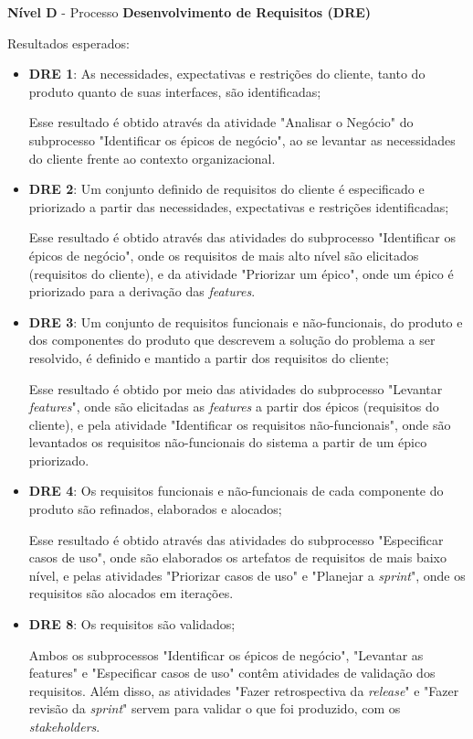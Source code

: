       \noindent
      \textbf{Nível D} - Processo \textbf{Desenvolvimento de Requisitos (DRE)}
	  
	  \noindent
	  Resultados esperados:
	  
	  \begin{itemize}
	  
	  \item \textbf{DRE 1}: As necessidades, expectativas e restrições do cliente, tanto do produto quanto
	    de suas interfaces, são identificadas;
	    
	    Esse resultado é obtido através da atividade "Analisar o Negócio" do subprocesso "Identificar os épicos de negócio",
	    ao se levantar as necessidades do cliente frente ao contexto organizacional.
	  
	  \item \textbf{DRE 2}: Um conjunto definido de requisitos do cliente é especificado e priorizado a partir das
	    necessidades, expectativas e restrições identificadas;
	    
	    Esse resultado é obtido através das atividades do subprocesso "Identificar os épicos de negócio", onde os
	    requisitos de mais alto nível são elicitados (requisitos do cliente), e da atividade "Priorizar um épico", onde 
	    um épico é priorizado para a derivação das \textit{features}.
	  
	  \item \textbf{DRE 3}: Um conjunto de requisitos funcionais e não-funcionais, do produto e dos componentes do produto
	    que descrevem a solução do problema a ser resolvido, é definido e mantido a partir dos requisitos do cliente;
	    
	    Esse resultado é obtido por meio das atividades do subprocesso "Levantar \textit{features}", onde são elicitadas
	    as \textit{features} a partir dos épicos (requisitos do cliente), e pela atividade
	    "Identificar os requisitos não-funcionais", onde são levantados os requisitos não-funcionais do sistema a partir de
	    um épico priorizado.
	    
	  \item \textbf{DRE 4}: Os requisitos funcionais e não-funcionais de cada componente do produto são refinados, 
	    elaborados e alocados;
	    
	    Esse resultado é obtido através das atividades do subprocesso "Especificar casos de uso", onde são elaborados
	    os artefatos de requisitos de mais baixo nível, e pelas atividades "Priorizar casos de uso" e 
	    "Planejar a \textit{sprint}", onde os requisitos são alocados em iterações. 
	    
	  \item \textbf{DRE 8}: Os requisitos são validados;
	  
	     Ambos os subprocessos "Identificar os épicos de negócio", "Levantar as features" e "Especificar casos de uso" contêm
	     atividades de validação dos requisitos. Além disso, as atividades "Fazer retrospectiva da \textit{release}" e 
	     "Fazer revisão da \textit{sprint}" servem para validar o que foi produzido, com os \textit{stakeholders}.
	  
	  \end{itemize}
	  
	  
	  \vfill